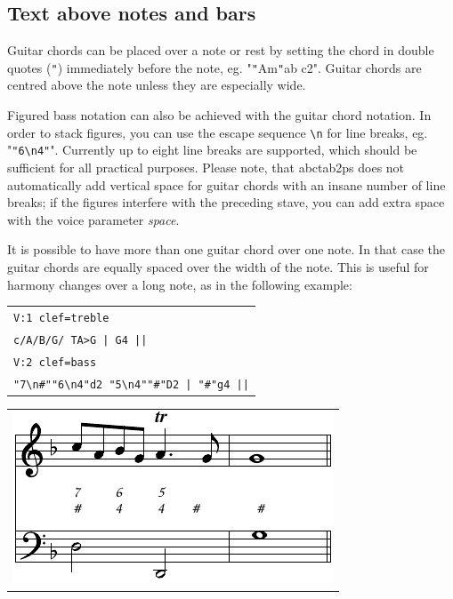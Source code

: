 \documentclass[a4paper]{article}
\begin{document}
\subsection{Text above notes and bars}
Guitar chords can be placed over a note or rest by setting the
chord in double quotes ({\tt "}) immediately before the note,
eg. "{\tt "}Am{\tt "}ab c2". Guitar chords are centred above
the note unless they are especially wide.
\par
{} 
Figured bass notation can also be achieved with the guitar chord
notation. In order to stack figures, you can use the escape sequence
\verb$\n$ for line breaks, eg. "\verb$"6\n4"$".
Currently up to eight line breaks are supported, which should
be sufficient for all practical purposes. Please note, that abctab2ps
does not automatically add vertical space for guitar chords with
an insane number of line breaks; if the figures interfere
with the preceding stave, you can add extra space with the voice
parameter {\it space}.
\par
It is possible to have more than one guitar chord over one note. In that
case the guitar chords are equally spaced over the width of the note.
This is useful for harmony changes over a long note, as in the following
example:

\begin{center}
\begin{tabular}{l}
\verb$V:1 clef=treble$ \\
\verb$c/A/B/G/ TA>G | G4 ||$ \\
\verb$V:2 clef=bass$ \\
\verb$"7\n#""6\n4"d2 "5\n4""#"D2 | "#"g4 ||$
\end{tabular}
\begin{tabular}{l}
\includegraphics{sample4c}
\end{tabular}
\end{center}
\end{document}
